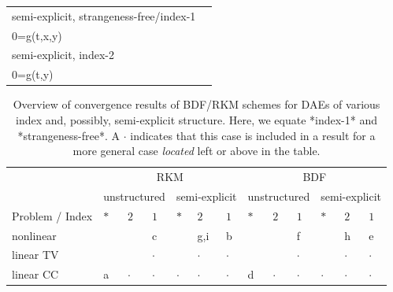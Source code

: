 \documentclass[]{book}
\theoremstyle{definition}
\theoremstyle{definition}
\theoremstyle{definition}
\theoremstyle{remark}
\begin{document}
\begin{longtable}[]{@{}ll@{}}
\begin{minipage}[t]{0.41\columnwidth}
semi-explicit, strangeness-free/index-1\strut
\end{minipage} & \begin{minipage}[t]{0.26\columnwidth}\raggedright\strut
\(\begin{cases}\dot x= f(t, x, y) \\ 0=g(t,x,y) \end{cases}\)\strut
\end{minipage}\tabularnewline
\begin{minipage}[t]{0.41\columnwidth}\raggedright\strut
semi-explicit, index-2\strut
\end{minipage} & \begin{minipage}[t]{0.26\columnwidth}\raggedright\strut
\(\begin{cases}\dot x= f(t, x, y) \\ 0=g(t,y) \end{cases}\)\strut
\end{minipage}\tabularnewline
\bottomrule
\end{longtable}

\begin{table}

\caption{\label{tab:unnamed-chunk-1}Overview of convergence results of BDF/RKM schemes for DAEs of various index and, possibly, semi-explicit structure. Here, we equate *index-1* and *strangeness-free*. A $\cdot$ indicates that this case is included in a result for a more general case \emph{located} left or above in the table.}
\centering
\begin{tabular}[t]{lllllllllllll}
\toprule
\multicolumn{1}{c}{ } & \multicolumn{6}{c}{RKM} & \multicolumn{6}{c}{BDF} \\
\cmidrule(l{3pt}r{3pt}){2-7} \cmidrule(l{3pt}r{3pt}){8-13}
\multicolumn{1}{c}{ } & \multicolumn{3}{c}{unstructured} & \multicolumn{3}{c}{semi-explicit} & \multicolumn{3}{c}{unstructured} & \multicolumn{3}{c}{semi-explicit} \\
\cmidrule(l{3pt}r{3pt}){2-4} \cmidrule(l{3pt}r{3pt}){5-7} \cmidrule(l{3pt}r{3pt}){8-10} \cmidrule(l{3pt}r{3pt}){11-13}
Problem / Index & $*$ & $2$ & $1$ & $*$ & $2$ & $1$ & $*$ & $2$ & $1$ & $*$ & $2$ & $1$\\
\midrule
\rowcolor{gray!6}  nonlinear &  &  & c &  & g,i & b &  &  & f &  & h & e\\
linear TV &  &  & $\cdot$ &  & $\cdot$ & $\cdot$ &  &  & $\cdot$ &  & $\cdot$ & $\cdot$\\
\rowcolor{gray!6}  linear CC & a & $\cdot$ & $\cdot$ & $\cdot$ & $\cdot$ & $\cdot$ & d & $\cdot$ & $\cdot$ & $\cdot$ & $\cdot$ & $\cdot$\\
\bottomrule
\end{tabular}
\end{table}
\end{document}
